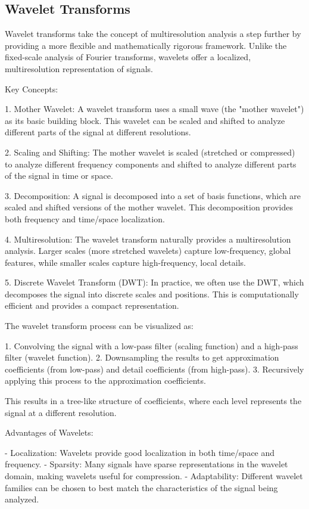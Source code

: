 \subsection{Wavelet Transforms}

Wavelet transforms take the concept of multiresolution analysis a step further by providing a more flexible and mathematically rigorous framework. Unlike the fixed-scale analysis of Fourier transforms, wavelets offer a localized, multiresolution representation of signals.

Key Concepts:

1. Mother Wavelet: A wavelet transform uses a small wave (the "mother wavelet") as its basic building block. This wavelet can be scaled and shifted to analyze different parts of the signal at different resolutions.

2. Scaling and Shifting: The mother wavelet is scaled (stretched or compressed) to analyze different frequency components and shifted to analyze different parts of the signal in time or space.

3. Decomposition: A signal is decomposed into a set of basis functions, which are scaled and shifted versions of the mother wavelet. This decomposition provides both frequency and time/space localization.

4. Multiresolution: The wavelet transform naturally provides a multiresolution analysis. Larger scales (more stretched wavelets) capture low-frequency, global features, while smaller scales capture high-frequency, local details.

5. Discrete Wavelet Transform (DWT): In practice, we often use the DWT, which decomposes the signal into discrete scales and positions. This is computationally efficient and provides a compact representation.

The wavelet transform process can be visualized as:

1. Convolving the signal with a low-pass filter (scaling function) and a high-pass filter (wavelet function).
2. Downsampling the results to get approximation coefficients (from low-pass) and detail coefficients (from high-pass).
3. Recursively applying this process to the approximation coefficients.

This results in a tree-like structure of coefficients, where each level represents the signal at a different resolution.

Advantages of Wavelets:

- Localization: Wavelets provide good localization in both time/space and frequency.
- Sparsity: Many signals have sparse representations in the wavelet domain, making wavelets useful for compression.
- Adaptability: Different wavelet families can be chosen to best match the characteristics of the signal being analyzed.


